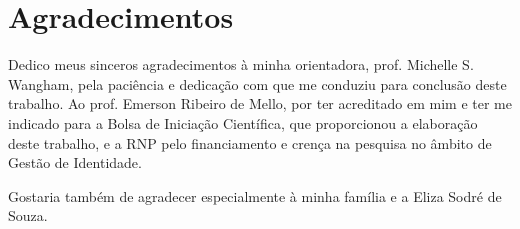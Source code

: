 %

\chapter*{Agradecimentos}

Dedico meus sinceros agradecimentos à minha orientadora, prof. Michelle S. Wangham, pela paciência e dedicação com que me conduziu para conclusão deste trabalho. Ao prof. Emerson Ribeiro de Mello, por ter acreditado em mim e ter me indicado para a Bolsa de Iniciação Científica, que proporcionou a elaboração deste trabalho, e a RNP pelo financiamento e crença na pesquisa no âmbito de Gestão de Identidade.

Gostaria também de agradecer especialmente à minha família e a Eliza Sodré de Souza.
